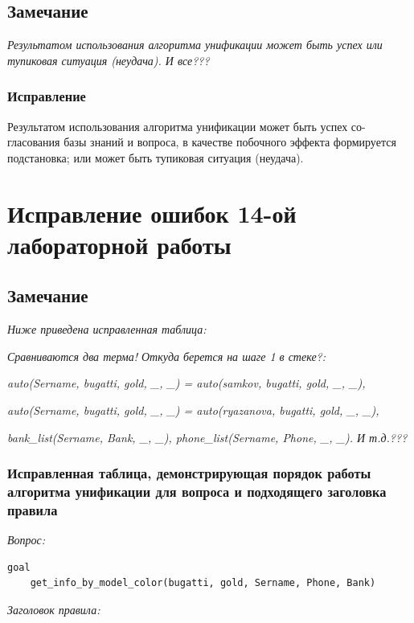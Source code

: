 \documentclass[a4paper,12pt]{article}
\begin{document}
	\subsection*{Замечание}
	
	\textit{Результатом использования алгоритма унификации может быть успех или тупиковая ситуация (неудача). И все???}
	
	\subsubsection*{Исправление}
	
	Результатом использования алгоритма унификации может быть успех со- гласования базы знаний и вопроса, в качестве побочного эффекта формируется подстановка; или может быть тупиковая ситуация (неудача).
	
	\section*{Исправление ошибок 14-ой лабораторной работы}
	
	\subsection*{Замечание}
	
	\textit{Ниже приведена исправленная таблица:}
	
	\textit{Сравниваются два терма! Откуда берется на шаге 1 в стеке?:}
	
	\textit{auto(Sername, bugatti, gold, \_, \_) = auto(samkov, bugatti, gold, \_, \_),}
	
	\textit{auto(Sername, bugatti, gold, \_, \_) = auto(ryazanova, bugatti, gold, \_, \_),}
	
	\textit{bank\_list(Sername, Bank, \_, \_), phone\_list(Sername, Phone, \_, \_).  И т.д.???}
	
	
	\subsubsection*{Исправленная таблица, демонстрирующая порядок работы алгоритма унификации для вопроса и подходящего заголовка правила}
	
	\textit{Вопрос:}
	
	\begin{verbatim}
goal
	get_info_by_model_color(bugatti, gold, Sername, Phone, Bank)
	\end{verbatim}
	
	\textit{Заголовок правила:}
	
\end{document}
